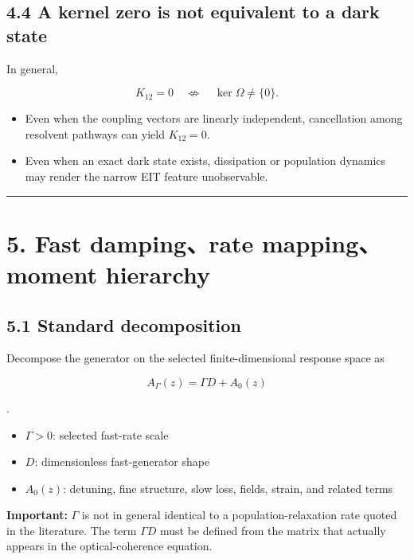 \documentclass[
  10pt,
  a4paper,
]{article}
\providecommand{\tightlist}{%
  \setlength{\itemsep}{0pt}\setlength{\parskip}{0pt}}
\begin{document}
\subsection{4.4 A kernel zero is not equivalent to a dark
state}\label{a-kernel-zero-is-not-equivalent-to-a-dark-state}

In general,

\[
K_{12}=0
\quad\not\Leftrightarrow\quad
\ker\Omega\neq\{0\}.
\]

\begin{itemize}
\tightlist
\item
  Even when the coupling vectors are linearly independent, cancellation
  among resolvent pathways can yield \(K_{12}=0\).
\item
  Even when an exact dark state exists, dissipation or population
  dynamics may render the narrow EIT feature unobservable.
\end{itemize}

\begin{center}\rule{0.5\linewidth}{0.5pt}\end{center}

\section{5. Fast damping、rate mapping、moment
hierarchy}\label{fast-dampingrate-mappingmoment-hierarchy}

\subsection{5.1 Standard decomposition}\label{standard-decomposition}

Decompose the generator on the selected finite-dimensional response
space as

\[
A_\Gamma(z)=\Gamma D+A_0(z)
\]

.

\begin{itemize}
\tightlist
\item
  \(\Gamma>0\): selected fast-rate scale
\item
  \(D\): dimensionless fast-generator shape
\item
  \(A_0(z)\): detuning, fine structure, slow loss, fields, strain, and
  related terms
\end{itemize}

\textbf{Important:} \(\Gamma\) is not in general identical to a
population-relaxation rate quoted in the literature. The term
\(\Gamma D\) must be defined from the matrix that actually appears in
the optical-coherence equation.
\end{document}
